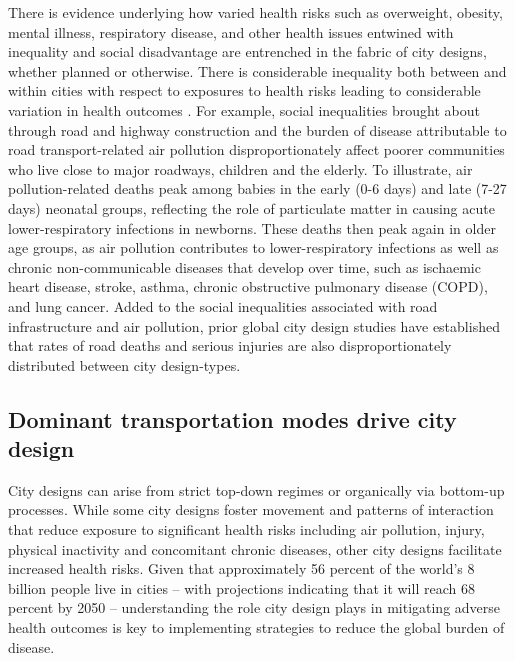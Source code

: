 \documentclass[preprint,10pt]{elsarticle} %
\begin{document}
There is evidence underlying how varied health risks such as overweight, obesity, mental illness, respiratory disease, and other health issues entwined with inequality and social disadvantage are entrenched in the fabric of city designs, whether planned or otherwise\cite{borrell2013factors,xing2016impact,yuchi2020road}. There is considerable inequality both between and within cities with respect to exposures to health risks leading to considerable variation in health outcomes \cite{KRISHNA2021102046}. For example, social inequalities brought about through road and highway construction\cite{carpenter2010poverty,archer2020white} and the burden of disease attributable to road transport-related air pollution disproportionately affect poorer communities who live close to major roadways, children and the elderly. To illustrate, air pollution-related deaths peak among babies in the early (0-6 days) and late (7-27 days) neonatal groups, reflecting the role of particulate matter in causing acute lower-respiratory infections in newborns. These deaths then peak again in older age groups, as air pollution contributes to lower-respiratory infections as well as chronic non-communicable diseases that develop over time, such as ischaemic heart disease, stroke, asthma, chronic obstructive pulmonary disease (COPD), and lung cancer\cite{boogaard2022long}. Added to the social inequalities associated with road infrastructure and air pollution, prior global city design studies have established that rates of road deaths and serious injuries are also disproportionately distributed between city design-types\cite{Thompson2020}.

\subsection*{Dominant transportation modes drive city design}
City designs can arise from strict top-down regimes\cite{mundigo1977city} or organically via bottom-up processes\cite{batty2017thinking, dovey2023atlas}. While some city designs foster movement and patterns of interaction that reduce exposure to significant health risks including air pollution, injury, physical inactivity and concomitant chronic diseases, other city designs facilitate increased health risks\cite{Wijnands2022, Stevenson2016,wang2023flood, stanley2022managing}. Given that approximately 56 percent of the world's 8 billion people live in cities -- with projections indicating that it will reach 68 percent by 2050\cite{WHO2023}  -- understanding the role city design plays in mitigating adverse health outcomes is key to implementing strategies to reduce the global burden of disease. 
\end{document}
